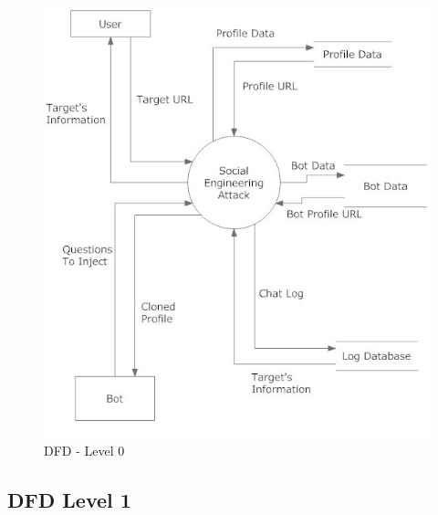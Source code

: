\begin{figure}[H]
\centering
\includegraphics[scale=0.8]{project/diagrams/dfd0}
\caption{DFD - Level 0}
\label{fig:dfd0}
\end{figure}

\subsection{DFD Level 1}

